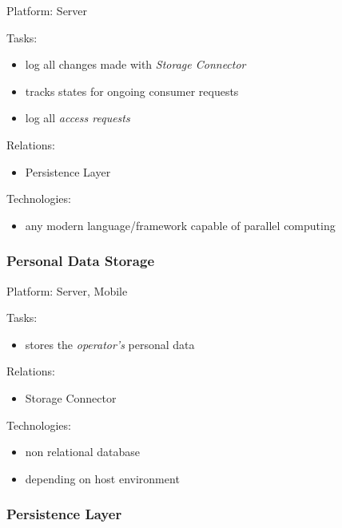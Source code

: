 \documentclass[12pt,english,a4paper,titlepage,cleardoublepage=empty,dottedtoc]{report}
\providecommand{\tightlist}{%
  \setlength{\itemsep}{0pt}\setlength{\parskip}{0pt}}
\begin{document}
Platform: Server

Tasks:

\begin{itemize}
\tightlist
\item
  log all changes made with \emph{Storage Connector}
\item
  tracks states for ongoing consumer requests
\item
  log all \emph{access requests}
\end{itemize}

Relations:

\begin{itemize}
\tightlist
\item
  Persistence Layer
\end{itemize}

Technologies:

\begin{itemize}
\tightlist
\item
  any modern language/framework capable of parallel computing
\end{itemize}

\subsubsection*{Personal Data Storage}\label{personal-data-storage}

Platform: Server, Mobile

Tasks:

\begin{itemize}
\tightlist
\item
  stores the \emph{operator's} personal data
\end{itemize}

Relations:

\begin{itemize}
\tightlist
\item
  Storage Connector
\end{itemize}

Technologies:

\begin{itemize}
\tightlist
\item
  non relational database
\item
  depending on host environment
\end{itemize}

\subsubsection*{Persistence Layer}\label{persistence-layer}
\end{document}
